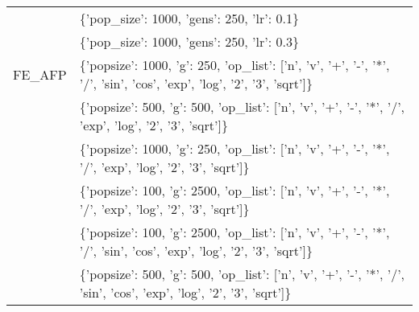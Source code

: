 \begin{tabular}{l p{37em}}
          &                                                                           \{'pop\_size': 1000, 'gens': 250, 'lr': 0.1\} \\
          &                                                                           \{'pop\_size': 1000, 'gens': 250, 'lr': 0.3\} \\
\midrule
   FE\_AFP & \{'popsize': 1000, 'g': 250, 'op\_list': ['n', 'v', '+', '-', '*', '/', 'sin', 'cos', 'exp', 'log', '2', '3', 'sqrt']\} \\
          &                \{'popsize': 500, 'g': 500, 'op\_list': ['n', 'v', '+', '-', '*', '/', 'exp', 'log', '2', '3', 'sqrt']\} \\
          &               \{'popsize': 1000, 'g': 250, 'op\_list': ['n', 'v', '+', '-', '*', '/', 'exp', 'log', '2', '3', 'sqrt']\} \\
          &               \{'popsize': 100, 'g': 2500, 'op\_list': ['n', 'v', '+', '-', '*', '/', 'exp', 'log', '2', '3', 'sqrt']\} \\
          & \{'popsize': 100, 'g': 2500, 'op\_list': ['n', 'v', '+', '-', '*', '/', 'sin', 'cos', 'exp', 'log', '2', '3', 'sqrt']\} \\
          &  \{'popsize': 500, 'g': 500, 'op\_list': ['n', 'v', '+', '-', '*', '/', 'sin', 'cos', 'exp', 'log', '2', '3', 'sqrt']\} \\
\bottomrule
\end{tabular}